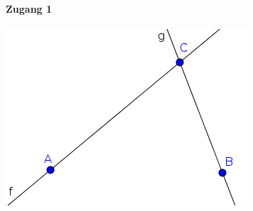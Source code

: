 \documentclass{article}
\begin{document}
\paragraph{Zugang 1}
\begin{center}
\includegraphics[scale=0.5]{limitations-Thales1-1}
\end{center}
\end{document}
